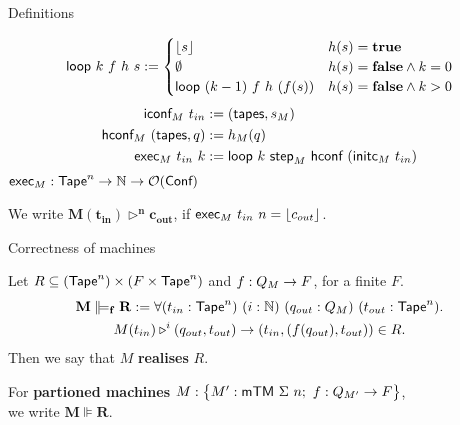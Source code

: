 \begin{frame}{Definitions}
  \begin{definition}[Execution]
    \begin{align*}
      \textsf{loop}~k~f~h~s :=
      \begin{cases}
        \left\lfloor {s}\right\rfloor                  & h(s) = \mathbf{true} \\
        \emptyset                     & h(s) = \mathbf{false} \land k = 0 \\
        \textsf{loop}~(k-1)~f~h~(f(s)) & h(s) = \mathbf{false} \land k > 0
      \end{cases}
    \end{align*}
    \pause%
    \begin{alignat*}{4}
      \textsf{iconf}_M ~ t_{in}          &:= (\textsf{tapes}, s_M) \\
      \textsf{hconf}_M ~ (\textsf{tapes}, q) &:= h_M(q) \\
      \textsf{exec}_M  ~ t_{in}~k        &:= \textsf{loop}~k~\textsf{step}_M~\textsf{hconf}~(\textsf{initc}_M~t_{in})
    \end{alignat*}
    {
      \small
      $\textsf{exec}_M : \textsf{Tape}^n \rightarrow \mathbb{N} \rightarrow \mathcal{O}(\textsf{Conf})$
    }
  \end{definition}

  \pause%
  We write $\mathbf{M(t_{in}) \triangleright^n c_{out}}$, if $\textsf{exec}_M~t_{in}~n= \left\lfloor {c_{out}}\right\rfloor$.
\end{frame}

\begin{frame}{Correctness of machines}
  \begin{definition}
    Let $R \subseteq (\textsf{Tape}^n) \times (F \times \textsf{Tape}^n)$ and $f : Q_M \rightarrow F$, for a finite $F$.\\
    \begin{multline*}
      \mathbf{M \VDash_f R} :=
      \forall (t_{in} : \Tape^n)~(i:\Nat)~(q_{out}:Q_M)~(t_{out} : \Tape^n). \\
      M(t_{in}) \triangleright^i (q_{out}, t_{out}) \rightarrow
      \left(t_{in}, \left(f(q_{out}), t_{out} \right) \right) \in R.
    \end{multline*}
    Then we say that $M$ \textbf{realises} $R$.
  \end{definition}
  \pause%
  For \textbf{partioned machines} $M : \bigl\{ M' : \textsf{mTM}~\Sigma~n;~ f : Q_{M'} \rightarrow F \bigr \}$,\\
  we write $\mathbf{M \VDash R}$.
\end{frame}

